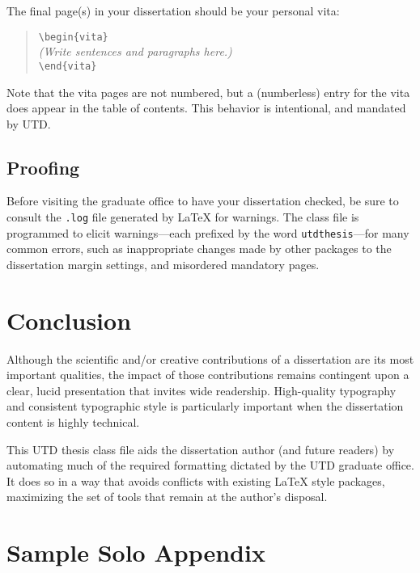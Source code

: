\documentclass[doublespacing]{utdthesis}
\newenvironment{exampleclasscode}
 {\parindent=1cm\begin{verse}}
 {\end{verse}}
\begin{document}
The final page(s) in your dissertation should be your personal vita:
\begin{exampleclasscode}
\verb|\begin{vita}| \\
\textit{(Write sentences and paragraphs here.)} \\
\verb|\end{vita}|
\end{exampleclasscode}
Note that the vita pages are not numbered, but a (numberless) entry for the
vita does appear in the table of contents.
This behavior is intentional, and mandated by UTD.

\section{Proofing}
\label{s:proof}

Before visiting the graduate office to have your dissertation checked, be sure
to consult the \texttt{.log} file generated by \LaTeX{} for warnings.
The class file is programmed to elicit warnings---each prefixed by the word
\texttt{utdthesis}---for many common errors, such as inappropriate changes
made by other packages to the dissertation margin settings, and misordered
mandatory pages.

\chapter{Conclusion}
\label{c:conclude}

Although the scientific and/or creative contributions of a dissertation are
its most important qualities, the impact of those contributions remains
contingent upon a clear, lucid presentation that invites wide readership.
High-quality typography and consistent typographic style is particularly
important when the dissertation content is highly technical.

This UTD thesis class file aids the dissertation author (and future readers)
by automating much of the required formatting dictated by the UTD graduate
office.
It does so in a way that avoids conflicts with existing \LaTeX{} style
packages, maximizing the set of tools that remain at the author's disposal.


\appendix %

\chapter*{Sample Solo Appendix}
\label{a:other}
\end{document}
